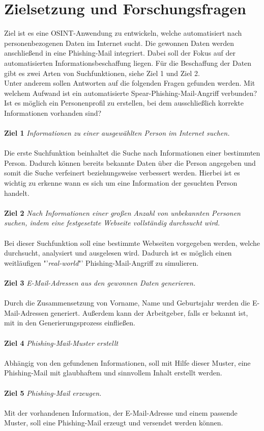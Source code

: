 \section{Zielsetzung und Forschungsfragen}
\label {sec:Zielsetzung}
Ziel ist es eine OSINT-Anwendung zu entwickeln, welche automatisiert nach personenbezogenen Daten im Internet sucht. Die gewonnen Daten werden anschließend in eine Phishing-Mail integriert. Dabei soll der Fokus auf der automatisierten Informationsbeschaffung liegen. Für die Beschaffung der Daten gibt es zwei Arten von Suchfunktionen, siehe Ziel 1 und Ziel 2.\\ 
Unter anderem sollen Antworten auf die folgenden Fragen gefunden werden. Mit welchem Aufwand ist ein automatisierte Spear-Phishing-Mail-Angriff verbunden? Ist es möglich ein Personenprofil zu erstellen, bei dem ausschließlich korrekte Informationen vorhanden sind?
 \\\\
 {\bf Ziel 1} \textit{Informationen zu einer ausgewählten Person im Internet suchen.}\\\\
 Die erste Suchfunktion beinhaltet die Suche nach Informationen einer bestimmten Person. Dadurch können bereits bekannte Daten über die Person angegeben und somit die Suche verfeinert beziehungsweise verbessert werden. Hierbei ist es wichtig zu erkenne wann es sich um eine Information der gesuchten Person handelt.\\\\
 {\bf Ziel 2} \textit{Nach Informationen einer großen Anzahl von unbekannten Personen suchen, indem eine festgesetzte Webseite vollständig durchsucht wird.}\\\\
 Bei dieser Suchfunktion soll eine bestimmte Webseiten vorgegeben werden, welche durchsucht, analysiert und ausgelesen wird. Dadurch ist es möglich einen weitläufigen "'\textit{real-world}"' Phishing-Mail-Angriff zu simulieren.\\\\
 {\bf Ziel 3} \textit{E-Mail-Adressen aus den gewonnen Daten generieren.}\\\\
 Durch die Zusammensetzung von Vorname, Name und Geburtsjahr werden die E-Mail-Adressen generiert. Außerdem kann der Arbeitgeber, falls er bekannt ist, mit in den Generierungsprozess einfließen.\\\\
 {\bf Ziel 4} \textit{Phishing-Mail-Muster erstellt}\\\\
 Abhängig von den gefundenen Informationen, soll mit Hilfe dieser Muster, eine Phishing-Mail mit glaubhaftem und sinnvollem Inhalt erstellt werden.\\\\
 {\bf Ziel 5} \textit{Phishing-Mail erzeugen.}\\\\
 Mit der vorhandenen Information, der E-Mail-Adresse und einem passende Muster, soll eine Phishing-Mail erzeugt und versendet werden können.
 
